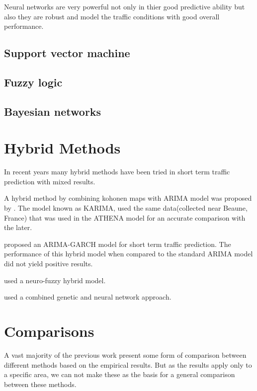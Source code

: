 Neural networks are very powerful not only in thier good predictive ability but also they are robust
and model the traffic conditions with good overall performance.

\subsection{Support vector machine}

\subsection{Fuzzy logic}

\citet{zhang2008short}

\subsection{Bayesian networks}

\citet{castillo2008predicting}


\section{Hybrid Methods}
In recent years many hybrid methods have been tried in short term traffic prediction with mixed
results.

A hybrid method by combining kohonen maps with ARIMA model was proposed by \citet{van1996combining}.
The model known as KARIMA, used the same data(collected near Beaune, France) that was used in the
ATHENA model for an accurate comparison with the later.

\citet{danech1991athena}

\citet{chen2011short} proposed an ARIMA-GARCH model for short term traffic prediction. The
performance of this hybrid model when compared to the standard ARIMA model did not yield positive
results.

\citet{ishak2004optimizing} used a neuro-fuzzy hybrid model.

\citet{vlahogianni2005optimized} used a combined genetic and neural network approach.

\section{Comparisons}
A vast majority of the previous work present some form of comparison between different methods based
on the empirical results. But as the results apply only to a specific area, we can not make these
as the basis for a general comparison between these methods.

